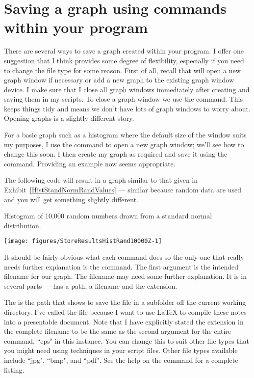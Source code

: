 \section{Saving a graph using commands within your \R{} program} 
 
There are several ways to save a graph created within your \R{} program. I offer one suggestion that I think provides some degree of flexibility, especially if you need to change the file type for some reason. First of all, recall that \R{} will open a new graph window if necessary or add a new graph to the existing graph window device. I make sure that I close all graph windows immediately after creating and saving them in my \R{} scripts. To close a graph window we use the  command. This keeps things tidy and means we don't have lots of graph windows to worry about. Opening graphs is a slightly different story. 
 
For a basic graph such as a histogram where the default size of the window suits my purposes, I use the  command to open a new graph window; we'll see how to change this soon. I then create my graph as required and save it using the  command. Providing an example now seems appropriate.  
 
The following code will result in a graph similar to that given in Exhibit~\ref{HistStandNormRandValues} --- similar because random data are used and you will get something slightly different.\begin{exhibit} 
\begin{center} 
\caption{Histogram of 10,000 random numbers drawn from a standard normal distribution. \label{HistStandNormRandValues}} 
\texttt{[image: figures/StoreResultsHistRand10000Z-1]} 
\end{center} 
\end{exhibit} 

 
It should be fairly obvious what each command does so the only one that really needs further explanation is the  command. The first argument is the intended filename for our graph. The filename may need some further explanation. It is in several parts ---  has a path, a filename and the extension. 
 
The  is the path that shows \R{} to save the file in a subfolder off the current working directory. I've called the file  because I want to use \LaTeX{} to compile these notes into a presentable document. 
Note that I have explicitly stated the extension in the complete filename to be the same as the second argument for the entire command, ``eps" in this instance. You can change this to suit other file types that you might need using  techniques in your script files. Other file types available include ``jpg", ``bmp", and ``pdf". See the help on the  command for a complete listing. 
 
